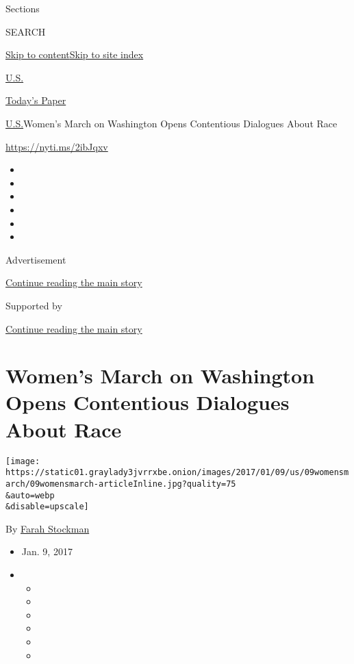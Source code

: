 Sections

SEARCH

\protect\hyperlink{site-content}{Skip to
content}\protect\hyperlink{site-index}{Skip to site index}

\href{https://www.nytimes3xbfgragh.onion/section/us}{U.S.}

\href{https://myaccount.nytimes3xbfgragh.onion/auth/login?response_type=cookie\&client_id=vi}{}

\href{https://www.nytimes3xbfgragh.onion/section/todayspaper}{Today's
Paper}

\href{/section/us}{U.S.}\textbar{}Women's March on Washington Opens
Contentious Dialogues About Race

\url{https://nyti.ms/2ibJqxv}

\begin{itemize}
\item
\item
\item
\item
\item
\item
\end{itemize}

Advertisement

\protect\hyperlink{after-top}{Continue reading the main story}

Supported by

\protect\hyperlink{after-sponsor}{Continue reading the main story}

\hypertarget{womens-march-on-washington-opens-contentious-dialogues-about-race}{%
\section{Women's March on Washington Opens Contentious Dialogues About
Race}\label{womens-march-on-washington-opens-contentious-dialogues-about-race}}

\texttt{[image: https://static01.graylady3jvrrxbe.onion/images/2017/01/09/us/09womensmarch/09womensmarch-articleInline.jpg?quality=75\\\&auto=webp\\\&disable=upscale]}

By \href{https://www.nytimes3xbfgragh.onion/by/farah-stockman}{Farah
Stockman}

\begin{itemize}
\item
  Jan. 9, 2017
\item
  \begin{itemize}
  \item
  \item
  \item
  \item
  \item
  \item
  \end{itemize}
\end{itemize}

